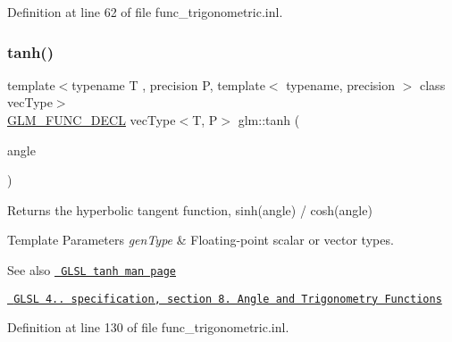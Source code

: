 Definition at line 62 of file func\+\_\+trigonometric.\+inl.

\mbox{\label{group__core__func__trigonometric_ga234e904a0075f88654a594b5f837711f}} 
\subsubsection{\texorpdfstring{tanh()}{tanh()}}
{\footnotesize\ttfamily template$<$typename T , precision P, template$<$ typename, precision $>$ class vec\+Type$>$ \\
\mbox{\hyperlink{setup_8hpp_ab2d052de21a70539923e9bcbf6e83a51}{G\+L\+M\+\_\+\+F\+U\+N\+C\+\_\+\+D\+E\+CL}} vec\+Type$<$T, P$>$ glm\+::tanh (\begin{DoxyParamCaption}\item[{vec\+Type$<$ T, P $>$ const \&}]{angle }\end{DoxyParamCaption})}

Returns the hyperbolic tangent function, sinh(angle) / cosh(angle)


\begin{DoxyTemplParams}{Template Parameters}
{\em gen\+Type} & Floating-\/point scalar or vector types.\\
\hline
\end{DoxyTemplParams}
\begin{DoxySeeAlso}{See also}
\href{http://www.opengl.org/sdk/docs/manglsl/xhtml/tanh.xml}{\texttt{ G\+L\+SL tanh man page}} 

\href{http://www.opengl.org/registry/doc/GLSLangSpec.4.20.8.pdf}{\texttt{ G\+L\+SL 4.. specification, section 8. Angle and Trigonometry Functions}} 
\end{DoxySeeAlso}


Definition at line 130 of file func\+\_\+trigonometric.\+inl.

